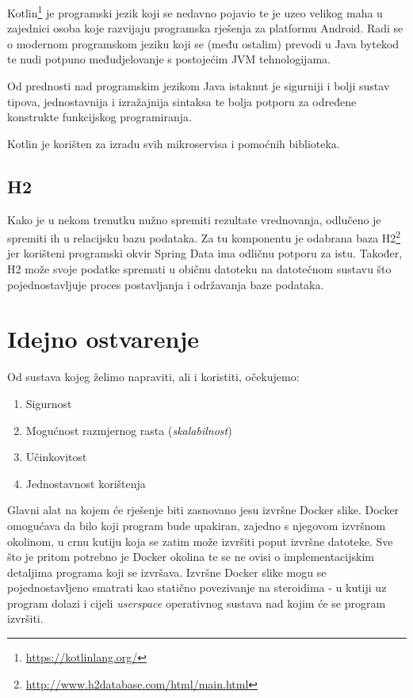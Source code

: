 \documentclass[times, utf8, zavrsni]{fer}
\begin{document}
Kotlin{\footnote{\url{https://kotlinlang.org/}}} je programski jezik koji se nedavno pojavio te je uzeo velikog maha u zajednici osoba koje razvijaju programska rješenja za platformu Android. Radi se o modernom programskom jeziku koji se (među ostalim) prevodi u Java bytekod te nudi potpuno međudjelovanje s postojećim JVM tehnologijama.

Od prednosti nad programskim jezikom Java istaknut je sigurniji i bolji sustav tipova, jednostavnija i izražajnija sintaksa te bolja potporu za određene konstrukte funkcijskog programiranja.

Kotlin je korišten za izradu svih mikroservisa i pomoćnih biblioteka. 

\subsection{H2}

Kako je u nekom trenutku nužno spremiti rezultate vrednovanja, odlučeno je spremiti ih u relacijsku bazu podataka. Za tu komponentu je odabrana baza H2{\footnote{\url{http://www.h2database.com/html/main.html}}} jer korišteni programski okvir Spring Data ima odličnu potporu za istu. Također, H2 može svoje podatke spremati u običnu datoteku na datotečnom sustavu što pojednostavljuje proces postavljanja i održavanja baze podataka.

\section{Idejno ostvarenje}

Od sustava kojeg želimo napraviti, ali i koristiti, očekujemo:

\begin{enumerate}
\item Sigurnost
\item Mogućnost razmjernog rasta (\textit{skalabilnost})
\item Učinkovitost
\item Jednostavnost korištenja
\end{enumerate}

Glavni alat na kojem će rješenje biti zasnovano jesu izvršne Docker slike. Docker omogućava da bilo koji program bude upakiran, zajedno s njegovom izvršnom okolinom, u crnu kutiju koja se zatim može izvršiti poput izvršne datoteke. Sve što je pritom potrebno je Docker okolina te se ne ovisi o implementacijskim detaljima programa koji se izvršava. Izvršne Docker slike mogu se pojednostavljeno smatrati kao statično povezivanje na steroidima - u kutiji uz program dolazi i cijeli \textit{userspace} operativnog sustava nad kojim će se program izvršiti.
\end{document}
